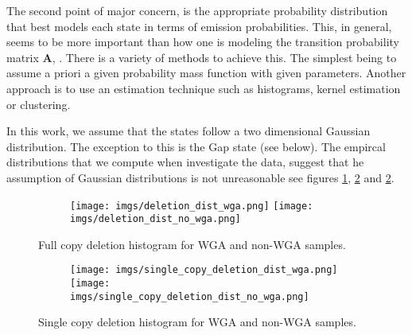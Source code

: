 The second point of major concern, is the appropriate probability distribution that best models each state in terms of emission probabilities. This, in general, seems to be more important than how one is modeling the transition probability matrix $\mathbf{A}$, \cite{rabiner2009}.  There is a variety of methods to achieve this. The simplest being to assume a priori a given probability mass function with given parameters. Another approach is to  use an estimation technique such as histograms, kernel estimation or clustering. 

In this work, we assume that the states follow a two dimensional Gaussian distribution. The exception to this is the Gap state (see below). The empircal distributions that we compute when investigate the data, suggest that he assumption of Gaussian distributions is not unreasonable see figures \ref{fig:image1}, \ref{fig:image2} and \ref{fig:image2}. 
\begin{figure}[h]
	\begin{subfigure}{}
		\texttt{[image: imgs/deletion\_dist\_wga.png]}
		\texttt{[image: imgs/deletion\_dist\_no\_wga.png]}	
	\end{subfigure}
	
	\caption{Full copy deletion histogram for WGA and non-WGA samples.  }
	\label{fig:image1}
\end{figure}


\begin{figure}[h]
	\begin{subfigure}{}
		\texttt{[image: imgs/single\_copy\_deletion\_dist\_wga.png]}
		\texttt{[image: imgs/single\_copy\_deletion\_dist\_no\_wga.png]}	
	\end{subfigure}
	
	\caption{Single copy deletion histogram for WGA and non-WGA samples.  }
	\label{fig:image2}
\end{figure}



